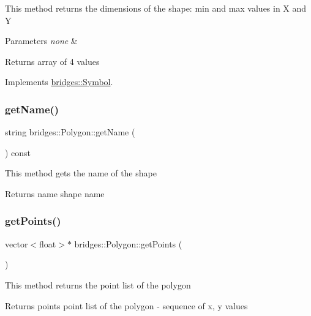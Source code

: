This method returns the dimensions of the shape\+: min and max values in X and Y


\begin{DoxyParams}{Parameters}
{\em none} & \\
\hline
\end{DoxyParams}
\begin{DoxyReturn}{Returns}
array of 4 values 
\end{DoxyReturn}


Implements \mbox{\hyperlink{classbridges_1_1_symbol_a6eb190dc71b31b344b7610a07c6dc1d5}{bridges\+::\+Symbol}}.

\mbox{\label{classbridges_1_1_polygon_af376b1e7ab19ae90e7de9ba1f717753b}} 
\subsubsection{\texorpdfstring{getName()}{getName()}}
{\footnotesize\ttfamily string bridges\+::\+Polygon\+::get\+Name (\begin{DoxyParamCaption}{ }\end{DoxyParamCaption}) const\hspace{0.3cm}{\ttfamily [inline]}}

This method gets the name of the shape

\begin{DoxyReturn}{Returns}
name shape name 
\end{DoxyReturn}
\mbox{\label{classbridges_1_1_polygon_aa4006759697d4428074747686cf231f9}} 
\subsubsection{\texorpdfstring{getPoints()}{getPoints()}}
{\footnotesize\ttfamily vector$<$float$>$$\ast$ bridges\+::\+Polygon\+::get\+Points (\begin{DoxyParamCaption}{ }\end{DoxyParamCaption})\hspace{0.3cm}{\ttfamily [inline]}}

This method returns the point list of the polygon

\begin{DoxyReturn}{Returns}
points point list of the polygon -\/ sequence of x, y values 
\end{DoxyReturn}
\mbox{\label{classbridges_1_1_polygon_a5c3e3bbeda23db712088278a3c82a0a6}} 
